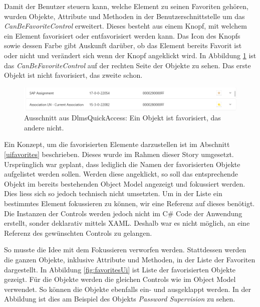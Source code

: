 Damit der Benutzer steuern kann, welche Element zu seinen Favoriten gehören, wurden Objekte, Attribute und Methoden in der Benutzerschnittstelle um das \textit{CanBeFavoriteControl} erweitert.
Dieses besteht aus einem Knopf, mit welchem ein Element favorisiert oder entfavorisiert werden kann.
Das Icon des Knopfs sowie dessen Farbe gibt Auskunft darüber, ob das Element bereits Favorit ist oder nicht und verändert sich wenn der Knopf angeklickt wird.
In Abbildung \ref{fig:objectModelWithFavorites} ist das \textit{CanBeFavoriteControl} auf der rechten Seite der Objekte zu sehen.
Das erste Objekt ist nicht favorisiert, das zweite schon.

\begin{figure}
   \centering
   \includegraphics[width=1.0\textwidth]{gfx/objectModelWithFavorites.png}
   \caption{
      Ausschnitt aus DlmsQuickAccess: Ein Objekt ist favorisiert, das andere nicht.
      }
   \label{fig:objectModelWithFavorites}
\end{figure}

Ein Konzept, um die favorisierten Elemente darzustellen ist im Abschnitt \ref{uifavorites} beschrieben.
Dieses wurde im Rahmen dieser Story umgesetzt.
Ursprünglich war geplant, dass lediglich die Namen der favorisierten Objekte aufgelistet werden sollen.
Werden diese angeklickt, so soll das entsprechende Objekt im bereits bestehenden Object Model angezeigt und fokussiert werden.
Dies liess sich so jedoch technisch nicht umsetzten.
Um in der Liste ein bestimmtes Element fokussieren zu können, wir eine Referenz auf dieses benötigt.
Die Instanzen der Controls werden jedoch nicht im C\# Code der Anwendung erstellt, sonder deklarativ mittels XAML.
Deshalb war es nicht möglich, an eine Referenz des gewünschten Controls zu gelangen.

So musste die Idee mit dem Fokussieren verworfen werden.
Stattdessen werden die ganzen Objekte, inklusive Attribute und Methoden, in der Liste der Favoriten dargestellt.
In Abbildung \ref{fig:favoritesUi} ist Liste der favorisierten Objekte gezeigt.
Für die Objekte werden die gleichen Controls wie im Object Model verwendet.
So können die Objekte ebenfalls ein- und ausgeklappt werden.
In der Abbildung ist dies am Beispiel des Objekts \textit{Password Supervision} zu sehen.

